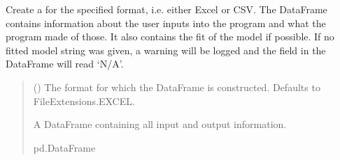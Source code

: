 \documentclass[letterpaper,10pt,english]{sphinxmanual}
\begin{document}
\begin{fulllineitems}

\begin{fulllineitems}
\label{\detokenize{ModelData:src.ModelData.ModelData.consts}}
\pysigstartsignatures
{}
\pysigstopsignatures
\end{fulllineitems}


\begin{fulllineitems}
\label{\detokenize{ModelData:src.ModelData.ModelData.create_dataframe_for}}
\pysigstartsignatures
{}
\pysigstopsignatures
\sphinxAtStartPar
Create a  for the specified format, i.e. either Excel or CSV.
The DataFrame contains information about the user inputs into the program and what the program
made of those. It also contains the fit of the model if possible. If no fitted model string was
given, a warning will be logged and the field in the DataFrame will read ‘N/A’.
\begin{quote}\begin{description}
\sphinxAtStartPar
{} ({\hyperref[\detokenize{FileHandler:src.FileHandler.FileExtensions}]{}}\sphinxstyleliteralemphasis{\sphinxupquote{, }}) \textendash{} The format for which the DataFrame is constructed. Defaults to FileExtensions.EXCEL.

\sphinxAtStartPar
A DataFrame containing all input and output information.

\sphinxAtStartPar
pd.DataFrame

\end{description}\end{quote}


\end{fulllineitems}
\end{fulllineitems}
\end{document}
